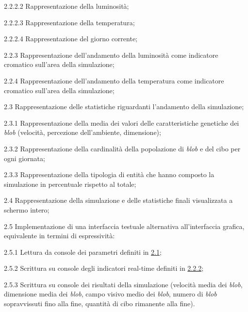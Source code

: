 \begin{myEnumerate}
\begin{myEnumerate}[label*=\arabic*.]
\begin{myEnumerate}[label*=\arabic*.]
\begin{myEnumerate}[label*=\arabic*.]
		        \item[2.2.2.2] Rappresentazione della luminosità;
	    	    \item[2.2.2.3] Rappresentazione della temperatura;
                \item[2.2.2.4] Rappresentazione del giorno corrente;
            \end{myEnumerate}
	    \item[2.2.3] Rappresentazione dell'andamento della luminosità come indicatore cromatico sull'area della simulazione;
	    \item[2.2.4] Rappresentazione dell'andamento della temperatura come indicatore cromatico sull'area della simulazione;
        \end{myEnumerate}
	\item[2.3] Rappresentazione delle statistiche riguardanti l'andamento della simulazione;
	\begin{myEnumerate}[label*=\arabic*.]
		    \item[2.3.1] Rappresentazione della media dei valori delle caratteristiche genetiche dei \textit{blob} (velocità, percezione dell'ambiente, dimensione);
		    \item[2.3.2] Rappresentazione della cardinalità della popolazione di \textit{blob} e del cibo per ogni giornata;
		    \item[2.3.3] Rappresentazione della tipologia di entità che hanno composto la simulazione in percentuale rispetto al totale;
	    \end{myEnumerate}
	    \item[2.4] Rappresentazione della simulazione e delle statistiche finali visualizzata a schermo intero;
	    \item[2.5] Implementazione di una interfaccia testuale alternativa all'interfaccia grafica, equivalente in termini di espressività:
	    \begin{myEnumerate}
		\item[2.5.1] Lettura da console dei parametri definiti in \hyperref[sec:2.1]{2.1};
		\item[2.5.2] Scrittura su console degli indicatori real-time definiti in \hyperref[sec:2.2.2]{2.2.2};
		\item[2.5.3] Scrittura su console dei risultati della simulazione (velocità media dei \textit{blob}, dimensione media dei \textit{blob}, campo visivo medio dei \textit{blob}, numero di \textit{blob} sopravvissuti fino alla fine, quantità di cibo rimanente alla fine).
	    \end{myEnumerate}
	\end{myEnumerate}
\end{myEnumerate}

